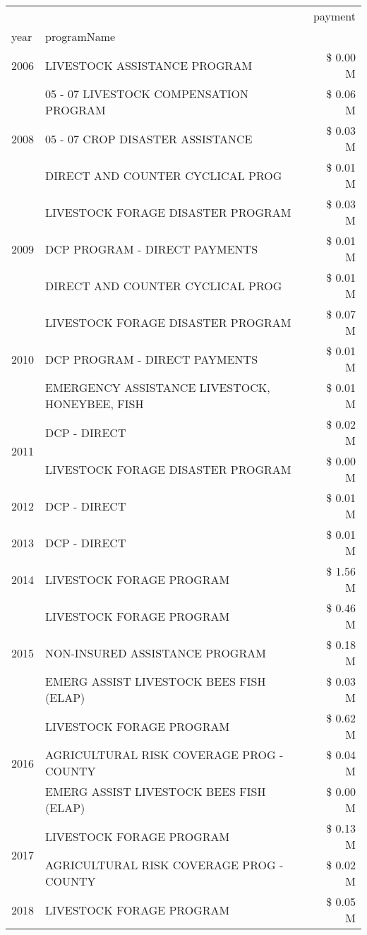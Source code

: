 \begin{tabular}{llr}
\toprule
 &  & payment \\
year & programName &  \\
\midrule
2006 & LIVESTOCK ASSISTANCE PROGRAM & \$ 0.00 M \\
\cline{1-3}
\multirow[t]{3}{*}{2008} & 05 - 07 LIVESTOCK COMPENSATION PROGRAM & \$ 0.06 M \\
 & 05 - 07 CROP DISASTER ASSISTANCE & \$ 0.03 M \\
 & DIRECT AND COUNTER CYCLICAL PROG & \$ 0.01 M \\
\cline{1-3}
\multirow[t]{3}{*}{2009} & LIVESTOCK FORAGE DISASTER  PROGRAM & \$ 0.03 M \\
 & DCP PROGRAM - DIRECT PAYMENTS & \$ 0.01 M \\
 & DIRECT AND COUNTER CYCLICAL PROG & \$ 0.01 M \\
\cline{1-3}
\multirow[t]{3}{*}{2010} & LIVESTOCK FORAGE DISASTER  PROGRAM & \$ 0.07 M \\
 & DCP PROGRAM - DIRECT PAYMENTS & \$ 0.01 M \\
 & EMERGENCY ASSISTANCE LIVESTOCK, HONEYBEE, FISH & \$ 0.01 M \\
\cline{1-3}
\multirow[t]{2}{*}{2011} & DCP - DIRECT & \$ 0.02 M \\
 & LIVESTOCK FORAGE DISASTER PROGRAM & \$ 0.00 M \\
\cline{1-3}
2012 & DCP - DIRECT & \$ 0.01 M \\
\cline{1-3}
2013 & DCP - DIRECT & \$ 0.01 M \\
\cline{1-3}
2014 & LIVESTOCK FORAGE PROGRAM & \$ 1.56 M \\
\cline{1-3}
\multirow[t]{3}{*}{2015} & LIVESTOCK FORAGE PROGRAM & \$ 0.46 M \\
 & NON-INSURED ASSISTANCE PROGRAM & \$ 0.18 M \\
 & EMERG ASSIST LIVESTOCK BEES FISH (ELAP) & \$ 0.03 M \\
\cline{1-3}
\multirow[t]{3}{*}{2016} & LIVESTOCK FORAGE PROGRAM                      & \$ 0.62 M \\
 & AGRICULTURAL RISK COVERAGE PROG - COUNTY      & \$ 0.04 M \\
 & EMERG ASSIST LIVESTOCK BEES FISH (ELAP)       & \$ 0.00 M \\
\cline{1-3}
\multirow[t]{2}{*}{2017} & LIVESTOCK FORAGE PROGRAM & \$ 0.13 M \\
 & AGRICULTURAL RISK COVERAGE PROG - COUNTY & \$ 0.02 M \\
\cline{1-3}
\multirow[t]{3}{*}{2018} & LIVESTOCK FORAGE PROGRAM & \$ 0.05 M \\

\end{tabular}
